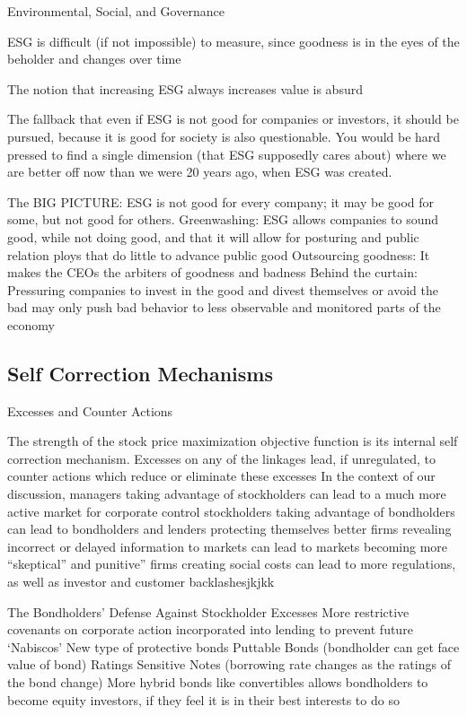 \documentclass[10pt]{article}
\begin{document}
    \begin{core}{Environmental, Social, and Governance}

      ESG is difficult (if not impossible) to measure, since goodness is in the eyes of the beholder and changes over time

      The notion that increasing ESG always increases value is absurd

      The fallback that even if ESG is not good for companies or investors, it should be pursued, because it is good for society is also questionable. You would be hard pressed to find a single dimension (that ESG supposedly cares about) where we are better off now than we were 20 years ago, when ESG was created.

      The BIG PICTURE: ESG is not good for every company; it may be good for some, but not good for others.
      Greenwashing: ESG allows companies to sound good, while not doing good, and that it will allow for posturing and public relation ploys that do little to advance public good
      Outsourcing goodness: It makes the CEOs the arbiters of goodness and badness
      Behind the curtain: Pressuring companies to invest in the good and divest themselves or avoid the bad may only push bad behavior to less observable and monitored parts of the economy

    \end{core}

  \subsection{Self Correction Mechanisms}

    \begin{core}{Excesses and Counter Actions}

      The strength of the stock price maximization objective function is its internal self correction mechanism. Excesses on any of the linkages lead, if unregulated, to counter actions which reduce or eliminate these excesses
      In the context of our discussion, 
      managers taking advantage of stockholders can lead to a much more active market for corporate control
      stockholders taking advantage of bondholders can lead to bondholders and lenders protecting themselves better
      firms revealing incorrect or delayed information to markets can lead to markets becoming more “skeptical” and punitive”
      firms creating social costs can lead to more regulations, as well as investor and customer backlashesjkjkk

      The Bondholders’ Defense Against Stockholder Excesses
      More restrictive covenants on corporate action incorporated into lending to prevent future ‘Nabiscos’
      New type of protective bonds
      Puttable Bonds (bondholder can get face value of bond)
      Ratings Sensitive Notes (borrowing rate changes as the ratings of the bond change)
      More hybrid bonds like convertibles allows bondholders to become equity investors, if they feel it is in their best interests to do so

    \end{core}
\end{document}
